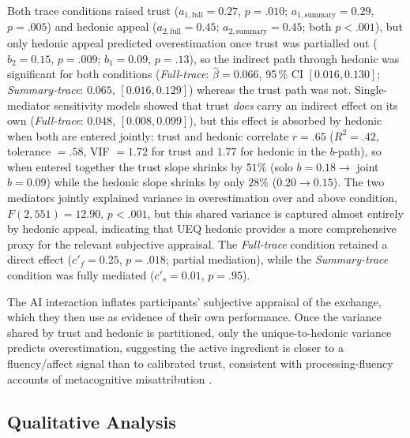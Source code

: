 \documentclass[manuscript,review,anonymous]{acmart}
\begin{document}
Both trace conditions raised trust ($a_{1,\text{full}} = 0.27$, $p = .010$; $a_{1,\text{summary}} = 0.29$, $p = .005$) and hedonic appeal ($a_{2,\text{full}} = 0.45$; $a_{2,\text{summary}} = 0.45$; both $p < .001$), but only hedonic appeal predicted overestimation once trust was partialled out ($b_{2} = 0.15$, $p = .009$; $b_{1} = 0.09$, $p = .13$), so the indirect path through hedonic was significant for both conditions (\textit{Full-trace}: $\hat{\beta} = 0.066$, 95\,\% CI $[0.016, 0.130]$; \textit{Summary-trace}: $0.065$, $[0.016, 0.129]$) whereas the trust path was not. Single-mediator sensitivity models showed that trust \emph{does} carry an indirect effect on its own (\textit{Full-trace}: $0.048$, $[0.008, 0.099]$), but this effect is absorbed by hedonic when both are entered jointly: trust and hedonic correlate $r = .65$ ($R^{2} = .42$, tolerance $= .58$, VIF $= 1.72$ for trust and $1.77$ for hedonic in the $b$-path), so when entered together the trust slope shrinks by $51\%$ (solo $b = 0.18 \to$ joint $b = 0.09$) while the hedonic slope shrinks by only $28\%$ ($0.20 \to 0.15$). The two mediators jointly explained variance in overestimation over and above condition, $F(2, 551) = 12.90$, $p < .001$, but this shared variance is captured almost entirely by hedonic appeal, indicating that UEQ hedonic provides a more comprehensive proxy for the relevant subjective appraisal. The \textit{Full-trace} condition retained a direct effect ($c'_{f} = 0.25$, $p = .018$; partial mediation), while the \textit{Summary-trace} condition was fully mediated ($c'_{s} = 0.01$, $p = .95$).

The AI interaction inflates participants' subjective appraisal of the exchange, which they then use as evidence of their own performance. Once the variance shared by trust and hedonic is partitioned, only the unique-to-hedonic variance predicts overestimation, suggesting the active ingredient is closer to a fluency/affect signal than to calibrated trust, consistent with processing-fluency accounts of metacognitive misattribution \cite{alter2009uniting}.


\subsection{Qualitative Analysis}


\end{document}
